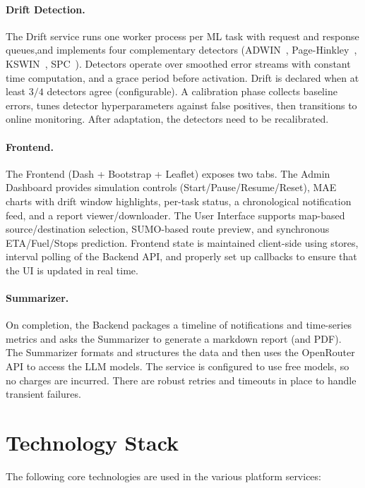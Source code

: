 \paragraph{Drift Detection.} The Drift service runs one worker process per ML task with request and response queues,and implements four complementary detectors (ADWIN~\cite{bifet2007learning}, Page-Hinkley~\cite{page1954continuous}, KSWIN~\cite{massey1951kolmogorov}, SPC~\cite{montgomery2020spc}).
Detectors operate over smoothed error streams with constant time computation, and a grace period before activation.
Drift is declared when at least $3/4$ detectors agree (configurable).
A calibration phase collects baseline errors, tunes detector hyperparameters against false positives, then transitions to online monitoring.
After adaptation, the detectors need to be recalibrated.

\paragraph{Frontend.} The Frontend (Dash + Bootstrap + Leaflet) exposes two tabs.
The Admin Dashboard provides simulation controls (Start/Pause/Resume/Reset), MAE charts with drift window highlights, per-task status, a chronological notification feed, and a report viewer/downloader.
The User Interface supports map-based source/destination selection, SUMO-based route preview, and synchronous ETA/Fuel/Stops prediction.
Frontend state is maintained client-side using stores, interval polling of the Backend API, and properly set up callbacks to ensure that the UI is updated in real time.

\paragraph{Summarizer.} On completion, the Backend packages a timeline of notifications and time-series metrics and asks the Summarizer to generate a markdown report (and PDF).
The Summarizer formats and structures the data and then uses the OpenRouter API to access the LLM models. The service is configured to use free models, so no charges are incurred. There are robust retries and timeouts in place to handle transient failures.

\section{Technology Stack}
The following core technologies are used in the various platform services:

